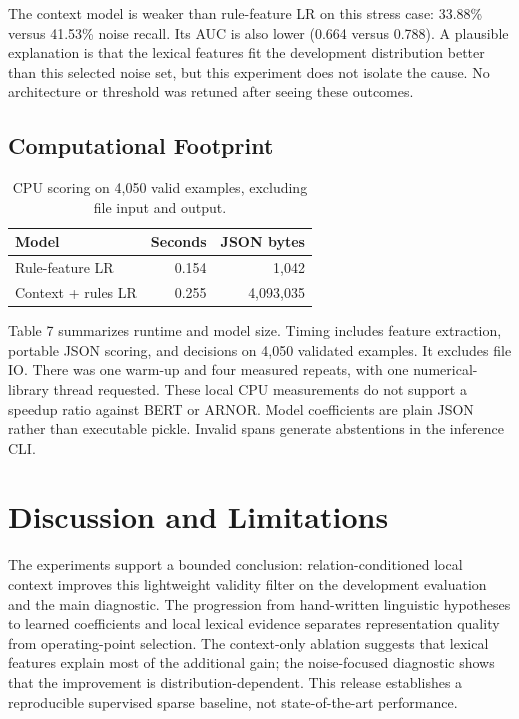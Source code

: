 \documentclass[11pt]{article}
\begin{document}
The context model is weaker than rule-feature LR on this stress case: 33.88\% versus 41.53\% noise recall. Its AUC is also lower (0.664 versus 0.788). A plausible explanation is that the lexical features fit the development distribution better than this selected noise set, but this experiment does not isolate the cause. No architecture or threshold was retuned after seeing these outcomes.

\subsection{Computational Footprint}

\begin{table}[t]\centering\small
\begin{tabular}{@{}lrr@{}}\toprule
Model & Seconds & JSON bytes\\\midrule
Rule-feature LR & 0.154 & 1,042\\
Context + rules LR & 0.255 & 4,093,035\\
\bottomrule\end{tabular}
\caption{CPU scoring on 4,050 valid examples, excluding file input and output.}\label{tab:cpu}
\end{table}

Table 7 summarizes runtime and model size. Timing includes feature extraction, portable JSON scoring, and decisions on 4,050 validated examples. It excludes file IO. There was one warm-up and four measured repeats, with one numerical-library thread requested. These local CPU measurements do not support a speedup ratio against BERT or ARNOR. Model coefficients are plain JSON rather than executable pickle. Invalid spans generate abstentions in the inference CLI.



\section{Discussion and Limitations}

The experiments support a bounded conclusion: relation-conditioned local context improves this lightweight validity filter on the development evaluation and the main diagnostic. The progression from hand-written linguistic hypotheses to learned coefficients and local lexical evidence separates representation quality from operating-point selection. The context-only ablation suggests that lexical features explain most of the additional gain; the noise-focused diagnostic shows that the improvement is distribution-dependent. This release establishes a reproducible supervised sparse baseline, not state-of-the-art performance.
\end{document}
